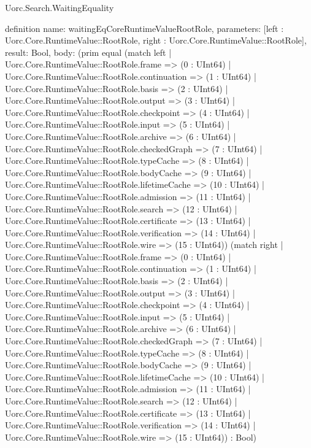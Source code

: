 \begin{lexlean}{Uorc.Search.WaitingEquality}
\begin{semanticmodule}
definition{
  name: waitingEqCoreRuntimeValueRootRole,
  parameters: [left : Uorc.Core.RuntimeValue::RootRole, right : Uorc.Core.RuntimeValue::RootRole],
  result: Bool,
  body: (prim equal (match left
    | Uorc.Core.RuntimeValue::RootRole.frame => (0 : UInt64)
    | Uorc.Core.RuntimeValue::RootRole.continuation => (1 : UInt64)
    | Uorc.Core.RuntimeValue::RootRole.basis => (2 : UInt64)
    | Uorc.Core.RuntimeValue::RootRole.output => (3 : UInt64)
    | Uorc.Core.RuntimeValue::RootRole.checkpoint => (4 : UInt64)
    | Uorc.Core.RuntimeValue::RootRole.input => (5 : UInt64)
    | Uorc.Core.RuntimeValue::RootRole.archive => (6 : UInt64)
    | Uorc.Core.RuntimeValue::RootRole.checkedGraph => (7 : UInt64)
    | Uorc.Core.RuntimeValue::RootRole.typeCache => (8 : UInt64)
    | Uorc.Core.RuntimeValue::RootRole.bodyCache => (9 : UInt64)
    | Uorc.Core.RuntimeValue::RootRole.lifetimeCache => (10 : UInt64)
    | Uorc.Core.RuntimeValue::RootRole.admission => (11 : UInt64)
    | Uorc.Core.RuntimeValue::RootRole.search => (12 : UInt64)
    | Uorc.Core.RuntimeValue::RootRole.certificate => (13 : UInt64)
    | Uorc.Core.RuntimeValue::RootRole.verification => (14 : UInt64)
    | Uorc.Core.RuntimeValue::RootRole.wire => (15 : UInt64)) (match right
    | Uorc.Core.RuntimeValue::RootRole.frame => (0 : UInt64)
    | Uorc.Core.RuntimeValue::RootRole.continuation => (1 : UInt64)
    | Uorc.Core.RuntimeValue::RootRole.basis => (2 : UInt64)
    | Uorc.Core.RuntimeValue::RootRole.output => (3 : UInt64)
    | Uorc.Core.RuntimeValue::RootRole.checkpoint => (4 : UInt64)
    | Uorc.Core.RuntimeValue::RootRole.input => (5 : UInt64)
    | Uorc.Core.RuntimeValue::RootRole.archive => (6 : UInt64)
    | Uorc.Core.RuntimeValue::RootRole.checkedGraph => (7 : UInt64)
    | Uorc.Core.RuntimeValue::RootRole.typeCache => (8 : UInt64)
    | Uorc.Core.RuntimeValue::RootRole.bodyCache => (9 : UInt64)
    | Uorc.Core.RuntimeValue::RootRole.lifetimeCache => (10 : UInt64)
    | Uorc.Core.RuntimeValue::RootRole.admission => (11 : UInt64)
    | Uorc.Core.RuntimeValue::RootRole.search => (12 : UInt64)
    | Uorc.Core.RuntimeValue::RootRole.certificate => (13 : UInt64)
    | Uorc.Core.RuntimeValue::RootRole.verification => (14 : UInt64)
    | Uorc.Core.RuntimeValue::RootRole.wire => (15 : UInt64)) : Bool)
}


\end{semanticmodule}
\end{lexlean}
